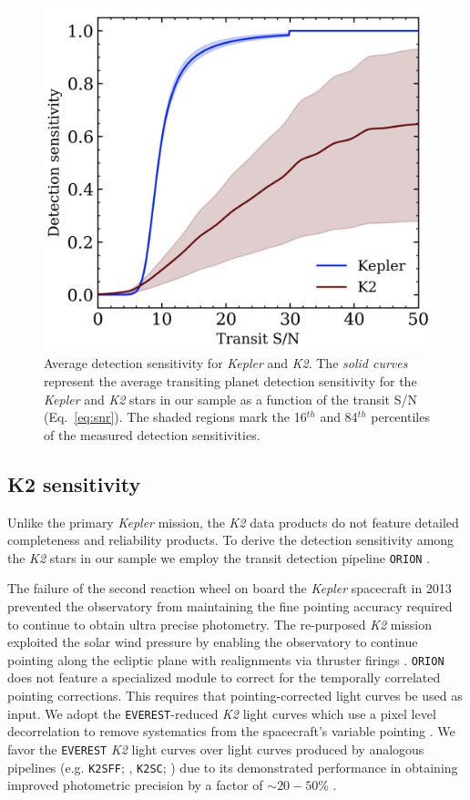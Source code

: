 \documentclass[twocolumn]{emulateapj}
\newcommand{\kepler}[1]{\emph{Kepler}#1}
\newcommand{\ktwo}[1]{\emph{K2}#1}
\begin{document}
\begin{figure}
  \centering
  \includegraphics[width=0.98\hsize]{figures/senscurves.png}
  \caption{Average detection sensitivity for \kepler{} and \ktwo{.} The \emph{solid curves} represent the
    average transiting planet detection sensitivity for the \kepler{} and \ktwo{} stars in our sample as
    a function of the transit S/N (Eq.~\ref{eq:snr}). The shaded regions mark the 16$^{th}$ and 84$^{th}$
    percentiles of the measured detection sensitivities.} 
  \label{fig:senscurves}
\end{figure}


\subsection{K2 sensitivity} \label{sect:k2sens}
Unlike the primary \kepler{} mission, the \ktwo{} data products do not feature detailed completeness and reliability
products. To derive the detection sensitivity among the \ktwo{} stars in our sample we employ the transit detection
pipeline \texttt{ORION} \citep{cloutier19b}.

The failure of the second reaction wheel on board the \kepler{} spacecraft in 2013 prevented the observatory from
maintaining the fine pointing accuracy required to continue to obtain ultra precise photometry. The re-purposed \ktwo{}
mission exploited the solar wind pressure by enabling the observatory to continue pointing along the ecliptic
plane with realignments via thruster firings \citep{howell14}.
\texttt{ORION} does not feature a specialized module to correct for the temporally correlated pointing corrections.
This requires that pointing-corrected light curves be used as input. We adopt
the \texttt{EVEREST}-reduced \ktwo{} light curves which use a pixel level decorrelation to remove systematics from
the spacecraft's variable pointing \citep{luger16,luger18}. We favor the \texttt{EVEREST} \ktwo{} light curves over
light curves produced by analogous pipelines (e.g. \texttt{K2SFF}; \citealt{vanderburg14}, \texttt{K2SC};
\citealt{aigrain15,aigrain16}) due to its demonstrated performance
in obtaining improved photometric precision by a factor of $\sim 20-50$\% \citep{luger16}.
\end{document}
